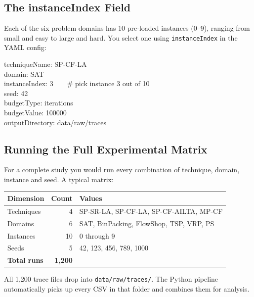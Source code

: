 \documentclass[12pt, a4paper]{article}
\begin{document}
\subsection{The instanceIndex Field}

Each of the six problem domains has 10 pre-loaded instances (0--9), ranging
from small and easy to large and hard. You select one using \texttt{instanceIndex}
in the YAML config:

\begin{tcolorbox}[colback=grey, colframe=darkgrey, arc=4pt, boxrule=0.6pt,
  fontupper=\ttfamily\small]
techniqueName: SP-CF-LA\\
domain: SAT\\
instanceIndex: 3\ \ \ \ \# pick instance 3 out of 10\\
seed: 42\\
budgetType: iterations\\
budgetValue: 100000\\
outputDirectory: data/raw/traces
\end{tcolorbox}

\subsection{Running the Full Experimental Matrix}

For a complete study you would run every combination of technique, domain,
instance and seed. A typical matrix:

\vspace{0.2cm}
\begin{center}
\begin{tabular}{lrl}
\toprule
\textbf{Dimension} & \textbf{Count} & \textbf{Values} \\
\midrule
Techniques & 4 & SP-SR-LA, SP-CF-LA, SP-CF-AILTA, MP-CF \\
Domains    & 6 & SAT, BinPacking, FlowShop, TSP, VRP, PS \\
Instances  & 10 & 0 through 9 \\
Seeds      & 5  & 42, 123, 456, 789, 1000 \\
\midrule
\textbf{Total runs} & \textbf{1,200} & \\
\bottomrule
\end{tabular}
\end{center}

\vspace{0.3cm}
All 1,200 trace files drop into \texttt{data/raw/traces/}. The Python pipeline
automatically picks up every CSV in that folder and combines them for analysis.
\end{document}
